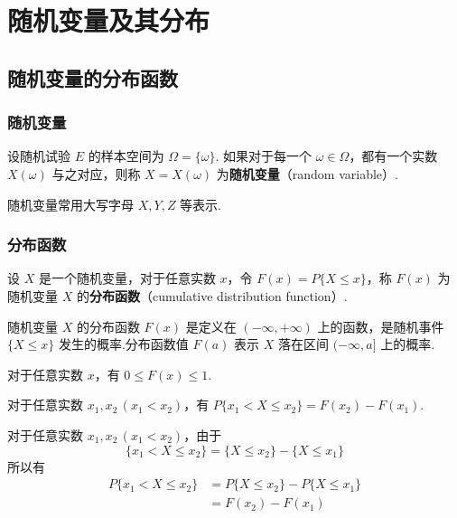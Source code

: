 \chapter{随机变量及其分布}

\section{随机变量的分布函数}

\subsection{随机变量}

\begin{definition}
    设随机试验 $E$ 的样本空间为 $\varOmega=\{\omega\}$. 如果对于每一个 $\omega\in\varOmega$，都有一个实数 $X(\omega)$ 与之对应，则称 $X=X(\omega)$ 为\textbf{随机变量}（random variable）.
\end{definition}

随机变量常用大写字母 $X,Y,Z$ 等表示.

\subsection{分布函数}

\begin{definition}
    设 $X$ 是一个随机变量，对于任意实数 $x$，令 $F(x)=P\{X \leqslant x\}$，称 $F(x)$ 为随机变量 $X$ 的\textbf{分布函数}（cumulative distribution function）.
\end{definition}

随机变量 $X$ 的分布函数 $F(x)$ 是定义在 $(-\infty,+\infty)$ 上的函数，是随机事件 $\{X \leqslant x\}$ 发生的概率.分布函数值 $F(a)$ 表示 $X$ 落在区间 $(-\infty,a]$ 上的概率.

\setcounter{propertyname}{0}

\begin{property}
    对于任意实数 $x$，有 $0 \leqslant F(x) \leqslant 1$.
\end{property}

\begin{property}
    对于任意实数 $x_1,x_2\, (x_1<x_2)$，有 $P\{x_1 < X \leqslant x_2\}=F(x_2)-F(x_1)$.
\end{property}

\begin{myproof}
    对于任意实数 $x_1,x_2\, (x_1<x_2)$，由于
    $$
    \{x_1 < X \leqslant x_2\} = \{X \leqslant x_2\} - \{X \leqslant x_1\}
    $$
    所以有
    $$
    \begin{aligned}
        P\{x_1 < X \leqslant x_2\} &= P\{X \leqslant x_2\} - P\{X \leqslant x_1\}\\
        &= F(x_2)-F(x_1)
    \end{aligned}
    $$
\end{myproof}

